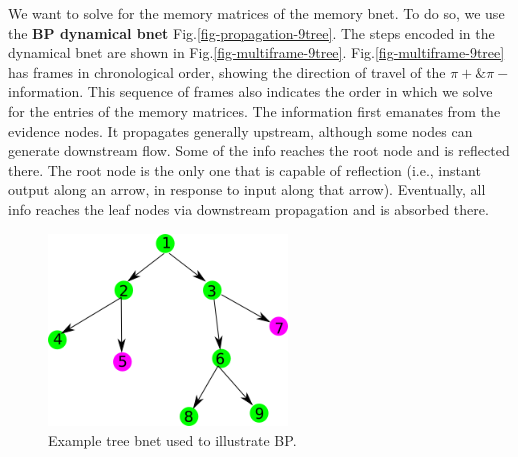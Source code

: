 We want to solve for the
memory matrices of the
memory bnet. To do so,
we use the {\bf BP dynamical bnet}
Fig.\ref{fig-propagation-9tree}.
The steps encoded
in the dynamical bnet
are shown in Fig.\ref{fig-multiframe-9tree}.
Fig.\ref{fig-multiframe-9tree}
has frames in chronological order,
showing the direction of travel
of the $\pi+\&\pi-$ information.
This sequence of frames also indicates
the order
in which we solve for the entries of
 the memory matrices.
The information first emanates from the evidence nodes.
It propagates generally upstream,
although some nodes
can generate downstream flow. Some of the
info  reaches the root node and is  reflected there.
The root node is the only one that
is capable of reflection (i.e., instant output
along an arrow,
in response to input along that arrow).
Eventually, all info
reaches the leaf nodes
via downstream propagation and is absorbed there.


\begin{figure}[h!]
\centering
\includegraphics[width=2.5in]
{mpass/mp-9tree.png}
\caption{Example tree bnet
used to illustrate BP.
}
\label{fig-mp-9tree}
\end{figure}



